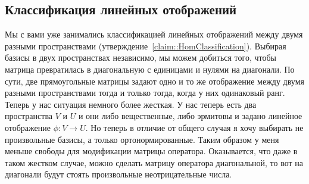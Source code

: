\subsection{Классификация линейных отображений}

Мы с вами уже занимались классификацией линейных отображений между двумя разными пространствами (утверждение~\ref{claim::HomClassification}).
Выбирая базисы в двух пространствах независимо, мы можем добиться того, чтобы матрица превратилась в диагональную с единицами и нулями на диагонали.
По сути, две прямоугольные матрицы задают одно и то же отображение между двумя разными пространствами тогда и только тогда, когда у них одинаковый ранг.
Теперь у нас ситуация немного более жесткая.
У нас теперь есть два пространства $V$ и $U$ и они либо вещественные, либо эрмитовы и задано линейное отображение $\phi\colon V\to U$.
Но теперь в отличие от общего случая я хочу выбирать не произвольные базисы, а только ортонормированные.
Таким образом у меня меньше свободы для модификации матрицы оператора.
Оказывается, что даже в таком жестком случае, можно сделать матрицу оператора диагональной, то вот на диагонали будут стоять произвольные неотрицательные числа.

